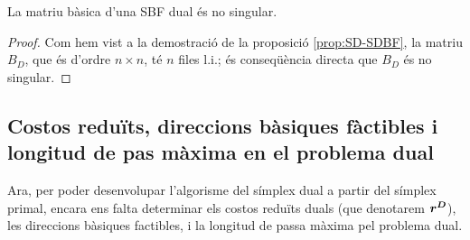 \begin{prop}
	La matriu bàsica d'una SBF dual és no singular.
	\begin{proof}
		Com hem vist a la demostració de la proposició \ref{prop:SD-SDBF}, la 
		matriu $B_D$, que és d'ordre $n\times n$, té $n$ files l.i.; és 
		conseqüència directa que $B_D$ és no singular.
	\end{proof}
\end{prop}

\subsection[Costos reduïts, DBF i longitud de pas màxima en el dual]%
{Costos reduïts, direccions bàsiques fàctibles i longitud de pas màxima en el problema dual}
Ara, per poder desenvolupar l'algorisme del símplex dual a partir del símplex 
primal, encara ens falta determinar els costos reduïts duals (que denotarem 
$\boldsymbol{r^D}$), les direccions bàsiques factibles, i la longitud de passa màxima 
pel problema dual.

